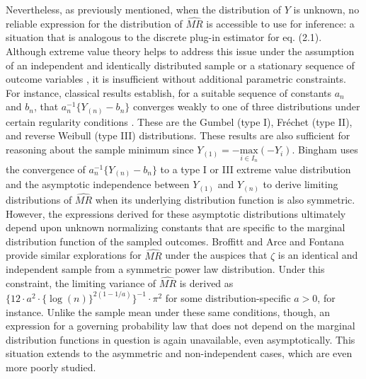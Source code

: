 \documentclass[12pt]{amsart}
\theoremstyle{plain}%
\theoremstyle{definition}
\theoremstyle{remark}
\numberwithin{equation}{section}
\begin{document}
Nevertheless, as previously mentioned, when the distribution of $Y$ is unknown, no reliable expression for the distribution of $\hat{MR}$ is accessible to use for inference: a situation that is analogous to the discrete plug-in estimator for eq. (2.1). Although extreme value theory helps to address this issue under the assumption of an independent and identically distributed sample or a stationary sequence of outcome variables \cite{leadbetter1988extremal}, it is insufficient without additional parametric constraints. For instance, classical results establish, for a suitable sequence of constants $a_n$ and $b_n$, that $a^{-1}_n \{ Y_{(n)} - b_n \}$ converges weakly to one of three distributions under certain regularity conditions \cite{leadbetter1988extremal, smith1990extreme, haan2006extreme, kotz2000extreme}. These are the Gumbel (type I), Fréchet (type II), and reverse Weibull (type III) distributions. These results are also sufficient for reasoning about the sample minimum since $Y_{(1)}=-\underset{i\in I_n}{\text{max}}(-Y_i)$.  Bingham \cite{bingham1995sample, bingham1996sample} uses the convergence of  $a^{-1}_n \{ Y_{(n)} - b_n \}$ to a type I or III extreme value distribution and the asymptotic independence between $Y_{(1)}$ and $Y_{(n)}$ to derive limiting distributions of $\hat{MR}$ when its underlying distribution function is also symmetric. However, the expressions derived for these asymptotic distributions ultimately depend upon unknown normalizing constants that are specific to the marginal distribution function of the sampled outcomes. Broffitt \cite{broffitt1974example} and Arce and Fontana \cite{arce1988midrange} provide similar explorations for $\hat{MR}$ under the auspices that $\zeta$ is an identical and independent sample from a symmetric power law distribution. Under this constraint, the limiting variance of $\hat{MR}$ is derived as $\{12 \cdot a^2 \cdot  \{ \log{(n)} \}^{2(1-1/a)} \}^{-1} \cdot \pi^2$ for some distribution-specific $a > 0$, for instance. Unlike the sample mean under these same conditions, though, an expression for a governing probability law that does not depend on the marginal distribution functions in question is again unavailable, even asymptotically. This situation extends to the asymmetric and non-independent cases, which are even more poorly studied. 
\end{document}

